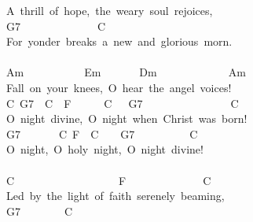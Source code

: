 \documentclass[]{book}
\begin{document}
A~thrill~of~hope,~the~weary~soul~rejoices,\\
\hspace*{0.333em}\hspace*{0.333em}\hspace*{0.333em}\hspace*{0.333em}G7~~~~~~~~~~~~~~C~~~~~~~~~~~~~~~~\\
For~yonder~breaks~a~new~and~glorious~morn.\\
~\\
Am~~~~~~~~~~~Em~~~~~~~Dm~~~~~~~~~~~~~Am\\
Fall~on~your~knees,~O~hear~the~angel~voices!\\
\hspace*{0.333em}\hspace*{0.333em}C~G7~~C~~F~~~~~~C~~~G7~~~~~~~~~~~~~~~~C\\
O~night~divine,~O~night~when~Christ~was~born!\\
\hspace*{0.333em}\hspace*{0.333em}G7~~~~~~~C~F~~C~~~~G7~~~~~~~~~~C\\
O~night,~O~holy~night,~O~night~divine!\\
~\\
C~~~~~~~~~~~~~~~~~~~F~~~~~~~~~~~~~~C\\
Led~by~the~light~of~faith~serenely~beaming,\\
\hspace*{0.333em}\hspace*{0.333em}\hspace*{0.333em}\hspace*{0.333em}\hspace*{0.333em}\hspace*{0.333em}\hspace*{0.333em}\hspace*{0.333em}\hspace*{0.333em}\hspace*{0.333em}\hspace*{0.333em}\hspace*{0.333em}\hspace*{0.333em}\hspace*{0.333em}\hspace*{0.333em}\hspace*{0.333em}\hspace*{0.333em}\hspace*{0.333em}\hspace*{0.333em}\hspace*{0.333em}\hspace*{0.333em}\hspace*{0.333em}\hspace*{0.333em}\hspace*{0.333em}\hspace*{0.333em}\hspace*{0.333em}\hspace*{0.333em}G7~~~~~~~~C\\
\end{document}
